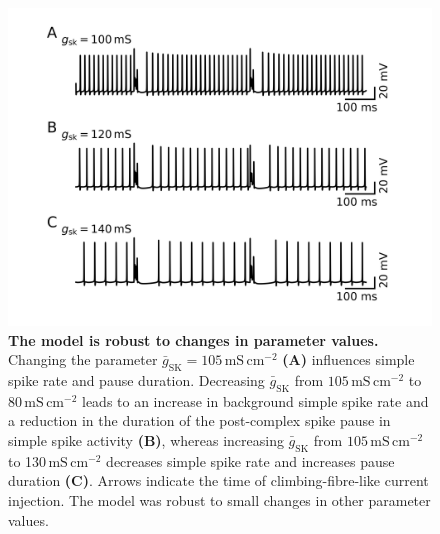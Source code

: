 \documentclass[twocolumn]{svjour3}          %
\newcommand{\msi}{\,\mathrm{mS\,cm^{-2}}}
\newcommand{\sk}{\mathrm{SK}}
\begin{document}
\begin{figure}[!ht]
  \includegraphics[width=\linewidth]{figure_gsk.jpg}
\caption{\textbf{The model is robust to changes in parameter values.}
 Changing the parameter $\bar{g}_\sk=105\msi$ \textbf{(A)} influences simple
  spike rate and pause duration. Decreasing $\bar{g}_\sk$ from
  $105\msi$ to 80$\msi$ leads to an increase in background simple spike
  rate and a reduction in the duration of the post-complex spike pause
  in simple spike activity \textbf{(B)}, whereas increasing
  $\bar{g}_\sk$ from $105\msi$ to 130$\msi$ decreases simple spike rate
  and increases pause duration \textbf{(C)}. Arrows indicate the time
  of climbing-fibre-like current injection. The model was robust to
  small changes in other parameter values.}
\label{S3_Fig}
\end{figure}
\end{document}
